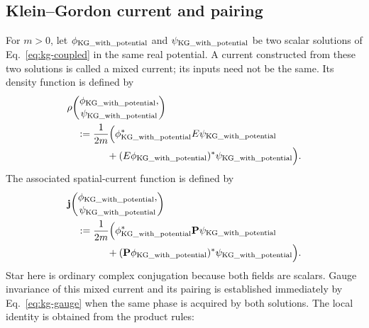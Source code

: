 \documentclass[10pt,letterpaper]{article}
\let\STAamsmathtext\text
\newcommand{\eqtext}[1]{\STAamsmathtext{\normalfont\rmfamily #1}}
\renewcommand{\text}[1]{\STAamsmathtext{\normalfont\rmfamily #1}}
\newcommand{\vct}[1]{\mathbf{#1}}
\begin{document}
\subsection{Klein--Gordon current and pairing}
For \(m>0\), let
\(\phi_{\eqtext{KG\_with\_potential}}\) and
\(\psi_{\eqtext{KG\_with\_potential}}\) be two scalar solutions of
Eq.\ \eqref{eq:kg-coupled} in the same real potential. A current constructed
from these two solutions is called a mixed current; its inputs need not be
the same. Its density function is defined by
\begin{equation}
\begin{aligned}
&\rho\!\left(
\begin{gathered}
\phi_{\eqtext{KG\_with\_potential}},\\[-0.2em]
\psi_{\eqtext{KG\_with\_potential}}
\end{gathered}
\right)\\
&\quad:=\frac{1}{2m}\Bigl(
\phi_{\eqtext{KG\_with\_potential}}^*
E\psi_{\eqtext{KG\_with\_potential}}\\
&\qquad\qquad
+(E\phi_{\eqtext{KG\_with\_potential}})^*
\psi_{\eqtext{KG\_with\_potential}}
\Bigr).
\end{aligned}
\label{eq:kg-mixed-current}
\end{equation}
The associated spatial-current function is defined by
\begin{equation}
\begin{aligned}
&\vct{j}\!\left(
\begin{gathered}
\phi_{\eqtext{KG\_with\_potential}},\\[-0.2em]
\psi_{\eqtext{KG\_with\_potential}}
\end{gathered}
\right)\\
&\quad:=\frac{1}{2m}\Bigl(
\phi_{\eqtext{KG\_with\_potential}}^*
\vct{P}\psi_{\eqtext{KG\_with\_potential}}\\
&\qquad\qquad
+(\vct{P}\phi_{\eqtext{KG\_with\_potential}})^*
\psi_{\eqtext{KG\_with\_potential}}
\Bigr).
\end{aligned}
\label{eq:kg-mixed-spatial-current}
\end{equation}
Star here is ordinary complex conjugation because both fields are scalars.
Gauge invariance of this mixed current and its pairing is established
immediately by Eq.\ \eqref{eq:kg-gauge} when the same phase is acquired by both solutions.
The local identity is obtained from the product rules:
\end{document}
